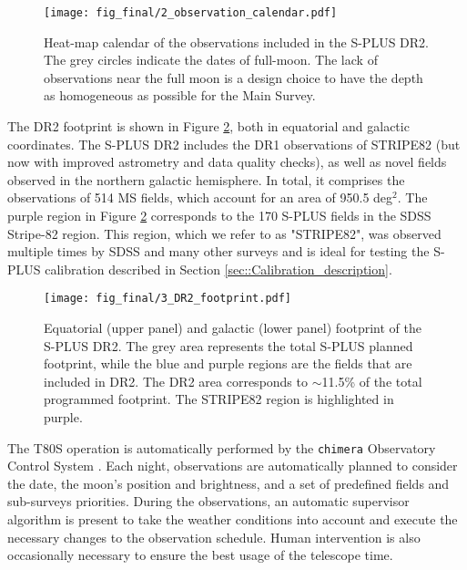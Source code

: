 \documentclass[fleqn,usenatbib]{mnras}
\begin{document}
\begin{figure}
\begin{center}
\texttt{[image: fig\_final/2\_observation\_calendar.pdf]}
\caption{\label{fig:DR2-ObsDate-heatmap}Heat-map calendar of the observations included in the S-PLUS DR2. The grey circles indicate the dates of full-moon. The lack of observations near the full moon is a design choice to have the depth as homogeneous as possible for the Main Survey.}
\end{center}
\end{figure}

The DR2 footprint is shown in Figure \ref{fig:DR2_footprint}, both in equatorial and galactic coordinates. The S-PLUS DR2 includes the DR1 observations of STRIPE82 (but now with improved astrometry and data quality checks), as well as novel fields observed in the northern galactic hemisphere. In total, it comprises the observations of 514 MS fields, which account for an area of 950.5 deg$^2$. The purple region in Figure \ref{fig:DR2_footprint} corresponds to the 170 S-PLUS fields in the SDSS Stripe-82 region. This region, which we refer to as "STRIPE82", was observed multiple times by SDSS and many other surveys and is ideal for testing the S-PLUS calibration described in Section \ref{sec::Calibration_description}.

\begin{figure}
\begin{center}
\texttt{[image: fig\_final/3\_DR2\_footprint.pdf]}
\caption{\label{fig:DR2_footprint}Equatorial (upper panel) and galactic (lower panel) footprint of the S-PLUS DR2. The grey area represents the total S-PLUS planned footprint, while the blue and purple regions are the fields that are included in DR2. The DR2 area corresponds to $\sim$11.5\% of the total programmed footprint. The STRIPE82 region is highlighted in purple.}

\end{center}
\end{figure}

The T80S operation is automatically performed by the \texttt{chimera} Observatory Control System \citep{HenriqueSilva+2017}. Each night, observations are automatically planned to consider the date, the moon's position and brightness, and a set of predefined fields and sub-surveys priorities. During the observations, an automatic supervisor algorithm is present to take the weather conditions into account and execute the necessary changes to the observation schedule. Human intervention is also occasionally necessary to ensure the best usage of the telescope time. 
\end{document}
